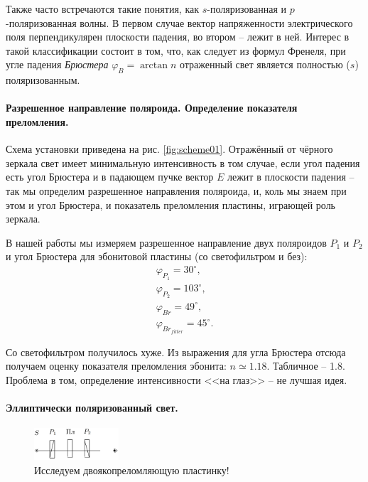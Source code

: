 \documentclass{../lab_class}
\begin{document}
Также часто встречаются такие понятия, как $s$-поляризованная и $p$-поляризованная волны. В первом случае вектор напряженности электрического поля перпендикулярен плоскости падения, во втором -- лежит в ней. Интерес в такой классификации состоит в том, что, как следует из формул Френеля, при угле падения \emph{Брюстера} $\varphi_B = \arctan n$ отраженный свет является полностью ($s$) поляризованным.

\paragraph{Разрешенное направление поляроида. Определение показателя преломления.}
Схема установки приведена на рис. \ref{fig:scheme01}. Отражённый от чёрного зеркала свет имеет минимальную интенсивность в том случае, если угол падения есть угол Брюстера и в падающем пучке вектор $E$ лежит в плоскости падения -- так мы определим разрешенное направления поляроида, и, коль мы знаем при этом и угол Брюстера, и показатель преломления пластины, играющей роль зеркала.

В нашей работы мы измеряем разрешенное направление двух поляроидов $P_1$ и $P_2$ и угол Брюстера для эбонитовой пластины (со светофильтром и без):
\begin{gather*}
	\varphi_{P_1} = 30^{\circ},  \\
	\varphi_{P_2} = 103^{\circ}, \\
	\varphi_{Br} = 49^{\circ}, \\
	\varphi_{Br_{filter}} = 45^{\circ}.
\end{gather*}

Со светофильтром получилось хуже. Из выражения для угла Брюстера отсюда получаем оценку показателя преломления эбонита: $\boxed{n \simeq 1.18}$. Табличное -- 1.8. Проблема в том, определение интенсивности <<на глаз>> -- не лучшая идея.

\pagebreak

\paragraph{Эллиптически поляризованный свет.}
\begin{figure}
  \vspace{-20pt}
  \begin{center}
    \includegraphics[width=0.28\textwidth]{02.png}
  \end{center}
  \vspace{-20pt}
  \caption{Исследуем двоякопреломляющую пластинку!}
  \label{fig:scheme02}
  \vspace{-10pt}
\end{figure}
\end{document}
